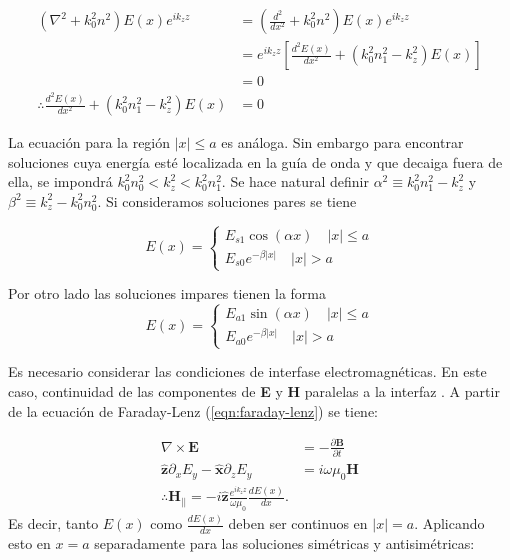 \begin{align*}
(\nabla^2  + k_0^2n^2) E(x)e^{ik_z z} &=  \left(\frac{d^2}{dx^2} + k_0^2n^2\right) E(x)e^{ik_z z } 
\\
&= e^{ik_z z}\left[\frac{d^2  E(x)}{dx^2}  + (k_0^2n_1^2 -  k_z^2)E(x) \right]
\\
&=0
\\
\therefore \frac{d^2  E(x)}{dx^2}  + (k_0^2n_1^2 -  k_z^2)E(x) &= 0
\end{align*}

La ecuación para la región $|x|\le a$ es análoga. Sin embargo para encontrar soluciones cuya energía esté localizada en la guía de onda y que decaiga fuera de ella, se impondrá $k_0^2n_0^2 < k_z^2 < k_0^2n_1^2$. Se hace natural definir $\alpha^2\equiv k_0^2n_1^2-k_z^2$ y $\beta^2\equiv k_z^2 - k_0^2n_0^2$. Si consideramos soluciones pares se tiene

\begin{equation*}
	E(x) = \left\{\begin{matrix}
	E_{s1}\cos(\alpha x)\quad |x|\le a
	\\
	E_{s0}e^{-\beta|x|} \quad |x|>a
	\end{matrix}\right.
\end{equation*}

Por otro lado las soluciones impares tienen la forma
\begin{equation*}
	E(x) = \left\{\begin{matrix}
	E_{a1}\sin(\alpha x)\quad |x|\le a
	\\
	E_{a0}e^{-\beta|x|} \quad |x|>a
	\end{matrix}\right.
\end{equation*}


Es necesario considerar las condiciones de interfase electromagnéticas. En este caso, continuidad de las componentes de \textbf{E} y \textbf{H} paralelas a la interfaz . A partir de la ecuación de Faraday-Lenz (\ref{eqn:faraday-lenz}) se tiene:

\begin{align*}
	\nabla\times\textbf{E} &= -\frac{\partial \textbf{B}}{\partial t}
	\\
	\mathbf{\hat{z}}\partial_x E_y-\mathbf{\hat{x}}\partial_z E_y  &= i\omega \mu_0  \textbf{H}
	\\	
	\therefore \textbf{H}_{||} = -i\mathbf{\hat{z}}\frac{e^{ik_z z}}{\omega\mu_0}\frac{d E(x)}{dx}.
\end{align*}
Es decir, tanto $E(x)$ como $\frac{dE(x)}{dx}$ deben ser continuos en $|x|=a$. Aplicando esto en $x=a$ separadamente para las soluciones simétricas y antisimétricas:

